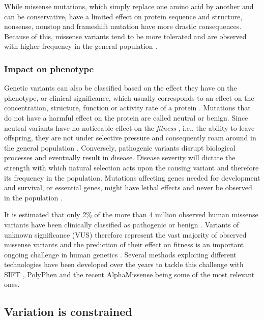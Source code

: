 While missense mutations, which simply replace one amino acid by another and can be conservative, have a limited effect on protein sequence and structure, nonsense, nonstop and frameshift mutation have more drastic consequences. Because of this, missense variants tend to be more tolerated and are observed with higher frequency in the general population \cite{COULTER_2004_MUTATIONS}.

\subsubsection{Impact on phenotype}

Genetic variants can also be classified based on the effect they have on the phenotype, or clinical significance, which usually corresponds to an effect on the concentration, structure, function or activity rate of a protein \cite{VIHINEN_2022_VARIATION}. Mutations that do not have a harmful effect on the protein are called neutral or benign. Since neutral variants have no noticeable effect on the \textit{fitness} \cite{DARWIN_1859_ORIGIN}, i.e., the ability to leave offspring, they are not under selective pressure and consequently roam around in the general population \cite{KIMURA_1968_NEUTRAL}. Conversely, pathogenic variants disrupt biological processes and eventually result in disease. Disease severity will dictate the strength with which natural selection acts upon the causing variant and therefore its frequency in the population. Mutations affecting genes needed for development and survival, or essential genes, might have lethal effects and never be observed in the population \cite{GLUECKSOHN_1963_LETHALITY}.

It is estimated that only 2\% of the more than 4 million observed human missense variants have been clinically classified as pathogenic or benign \cite{LEK_2016_EXAC}. Variants of unknown significance (VUS) therefore represent the vast majority of observed missense variants and the prediction of their effect on fitness is an important ongoing challenge in human genetics \cite{MCLAREN_2016_VEP}. Several methods exploiting different technologies have been developed over the years to tackle this challenge with SIFT \cite{KUMAR_2009_SIFT}, PolyPhen \cite{ADZHUBEI_2013_POLYPHEN} and the recent AlphaMissense \cite{CHENG_2023_ALPHAMISSENSE} being some of the most relevant ones.

\subsection{Variation is constrained}

